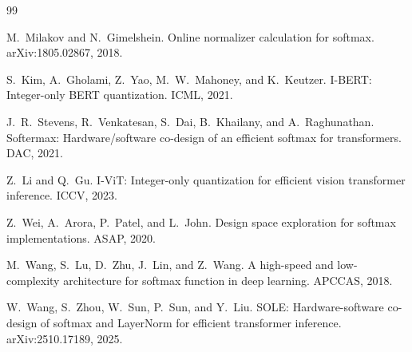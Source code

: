 \begingroup
\renewcommand{\sectionbreak}{\vspace{1.2em}}
\singlespacing\small
\setlength{\parskip}{0pt}
\begin{thebibliography}{99}
\setlength{\itemsep}{1pt}\setlength{\parsep}{0pt}

M.~Milakov and N.~Gimelshein. Online normalizer calculation for softmax. arXiv:1805.02867, 2018.

S.~Kim, A.~Gholami, Z.~Yao, M.~W.~Mahoney, and K.~Keutzer. I-BERT: Integer-only BERT quantization. ICML, 2021.

J.~R.~Stevens, R.~Venkatesan, S.~Dai, B.~Khailany, and A.~Raghunathan. Softermax: Hardware/software co-design of an efficient softmax for transformers. DAC, 2021.

Z.~Li and Q.~Gu. I-ViT: Integer-only quantization for efficient vision transformer inference. ICCV, 2023.

Z.~Wei, A.~Arora, P.~Patel, and L.~John. Design space exploration for softmax implementations. ASAP, 2020.

M.~Wang, S.~Lu, D.~Zhu, J.~Lin, and Z.~Wang. A high-speed and low-complexity architecture for softmax function in deep learning. APCCAS, 2018.

W.~Wang, S.~Zhou, W.~Sun, P.~Sun, and Y.~Liu. SOLE: Hardware-software co-design of softmax and LayerNorm for efficient transformer inference. arXiv:2510.17189, 2025.

\end{thebibliography}
\endgroup
